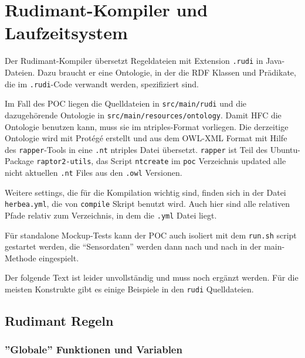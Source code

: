 \section{Rudimant-Kompiler und Laufzeitsystem}

Der Rudimant-Kompiler übersetzt Regeldateien mit Extension \texttt{.rudi} in
Java-Dateien. Dazu braucht er eine Ontologie, in der die RDF Klassen und
Prädikate, die im \texttt{.rudi}-Code verwandt werden, spezifiziert sind.

Im Fall des POC liegen die Quelldateien in \texttt{src/main/rudi} und die
dazugehörende Ontologie in \texttt{src/main/resources/ontology}. Damit HFC
die Ontologie benutzen kann, muss sie im ntriples-Format vorliegen. Die
derzeitige Ontologie wird mit Protégé erstellt und aus dem OWL-XML Format
mit Hilfe des \texttt{rapper}-Tools in eine \texttt{.nt} ntriples Datei
übersetzt. \texttt{rapper} ist Teil des Ubuntu-Package \texttt{raptor2-utils},
das Script \texttt{ntcreate} im \texttt{poc} Verzeichnis updated alle nicht
aktuellen \texttt{.nt} Files aus den \texttt{.owl} Versionen.

Weitere settings, die für die Kompilation wichtig sind, finden sich in der
Datei \texttt{herbea.yml}, die von \texttt{compile} Skript benutzt wird. Auch
hier sind alle relativen Pfade relativ zum Verzeichnis, in dem die
\texttt{.yml} Datei liegt.

Für standalone Mockup-Tests kann der POC auch isoliert mit dem \texttt{run.sh}
script gestartet werden, die ``Sensordaten'' werden dann nach und nach in
der main-Methode eingespielt.

Der folgende Text ist leider unvollständig und muss noch ergänzt werden. Für
die meisten Konstrukte gibt es einige Beispiele in den \texttt{rudi}
Quelldateien.

\subsection{Rudimant Regeln}


\subsubsection{''Globale'' Funktionen und Variablen}

